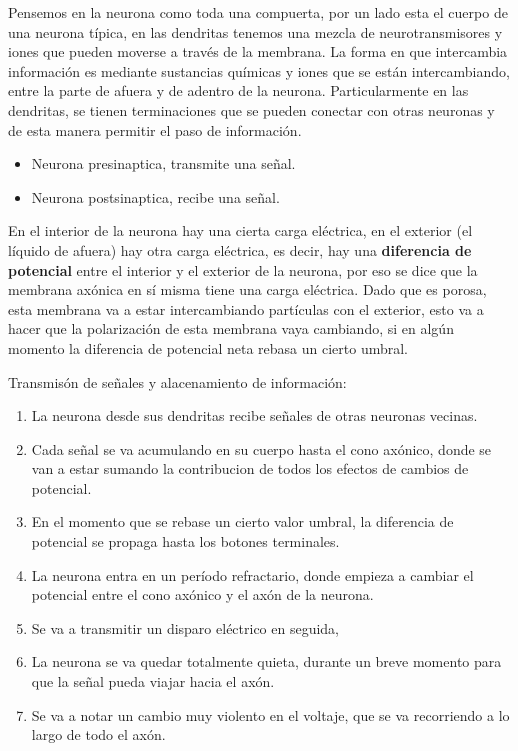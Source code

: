  Pensemos en la neurona como toda una compuerta, por un lado esta el cuerpo de una neurona típica, en las dendritas tenemos una mezcla de neurotransmisores y iones que pueden moverse a través de la membrana. La forma en que intercambia información es mediante sustancias químicas y iones que se están intercambiando, entre la parte de afuera y de adentro de la neurona. Particularmente en las dendritas, se tienen terminaciones que se pueden conectar con otras neuronas y de esta manera permitir el paso de información. 
 
 \begin{itemize}
  \item Neurona presinaptica, transmite una señal.
  \item Neurona postsinaptica, recibe una señal.
 \end{itemize}  
 
En el interior de la neurona hay una cierta carga eléctrica, en el exterior (el líquido de afuera) hay otra carga eléctrica, es decir, hay una \textbf{diferencia de potencial} entre el interior y el exterior de la neurona, por eso se dice que la membrana axónica en sí misma tiene una carga eléctrica. Dado que es porosa, esta membrana  va a estar intercambiando partículas con el exterior, esto va a hacer que la polarización de esta membrana vaya cambiando, si en algún momento la diferencia de potencial neta rebasa un cierto umbral.

Transmisón de señales y alacenamiento de información:

\begin{enumerate}
 \item La neurona desde sus dendritas recibe señales de otras neuronas vecinas.
 \item Cada señal se va acumulando en su cuerpo hasta el cono axónico, donde se van a estar sumando la contribucion de todos los efectos de cambios de potencial.
 \item En el momento que se rebase un cierto valor umbral, la diferencia de potencial se propaga hasta los botones terminales.
 \item La neurona entra en un período refractario, donde empieza a cambiar el potencial entre el cono axónico y el axón de la neurona.
 \item Se va a transmitir un disparo eléctrico en seguida,
 \item La neurona se va quedar totalmente quieta, durante un breve momento para que la señal pueda viajar hacia el axón.
 \item Se va a notar un cambio muy violento en el voltaje, que se va recorriendo a lo largo de todo el axón. 
\end{enumerate}


